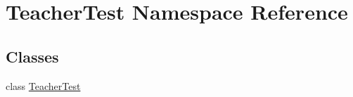 \hypertarget{namespaceTeacherTest}{}\section{Teacher\+Test Namespace Reference}
\label{namespaceTeacherTest}
\subsection*{Classes}
\begin{DoxyCompactItemize}
\item 
class \hyperlink{classTeacherTest_1_1TeacherTest}{Teacher\+Test}
\end{DoxyCompactItemize}
